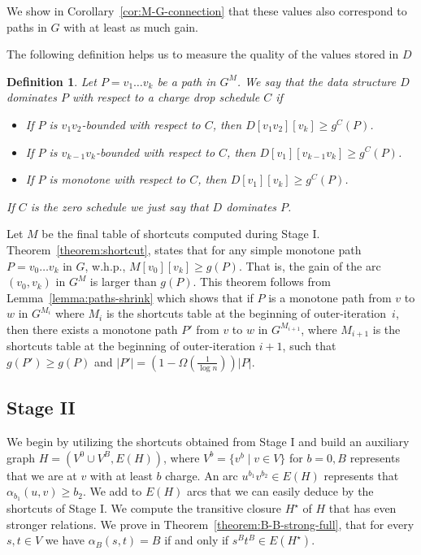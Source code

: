\documentclass[11pt]{article}
\newtheorem{definition}[theorem]{Definition}
\begin{document}
We show in Corollary~\ref{cor:M-G-connection} that these values also correspond to paths in $G$ with at least as much gain.

The following definition  helps us to measure the quality of the values stored in $D$

\begin{definition}
    Let $P=v_1 \ldots v_k$ be a path in $G^M$. We say that the data structure $D$ \emph{dominates} $P$ with respect to a charge drop schedule $C$ if 
    \begin{itemize}
        \item If $P$ is $v_1 v_2$-bounded with respect to $C$, then $D[v_1 v_2][v_k] \ge g^C(P)$.
        \item If $P$ is $v_{k-1} v_k$-bounded with respect to $C$, then $D[v_1][v_{k-1} v_k] \ge g^C(P)$.
        \item If $P$ is monotone with respect to $C$, then $D[v_1][v_k]\ge g^C(P)$.
    \end{itemize}
    If $C$ is the zero schedule we just say that $D$ dominates $P$.
\end{definition}



Let $M$ be the final table of shortcuts computed during Stage I.
Theorem~\ref{theorem:shortcut}, states that for any simple monotone path $P=v_0\ldots v_k$ in $G$, w.h.p.,  $M[v_0][v_k]\ge g(P)$. 
That is, the gain of the arc $(v_0,v_k)$ in
$G^M$ is larger than 
$g(P)$.
This theorem follows from 
Lemma~\ref{lemma:paths-shrink} which shows 
that if $P$ is a monotone path from $v$ to $w$ in $G^{M_i}$
where $M_i$ is the shortcuts table at the beginning of outer-iteration~$i$,
 then there exists a monotone path $P'$ from $v$ to $w$ in $G^{M_{i+1}}$,
where 
$M_{i+1}$ is the shortcuts table at the beginning of outer-iteration $i+1$,
such that  $g(P')\ge g(P)$
and 
 $|P'|=\left(1-\Omega\left( \frac{1}{\log n}\right) \right)|P|$. 


\subsection{Stage II}
We begin by utilizing the shortcuts obtained from Stage I and build an auxiliary graph $H = (V^0 \cup V^B, E(H))$, where $V^b = \{v^b \mid v\in V \}$ for $b=0,B$ represents that we are at $v$ with at least $b$ charge.  An arc $u^{b_1}v^{b_2}\in E(H)$ represents that $\alpha_{b_1}(u,v)\ge b_2$. We add to $E(H)$ arcs that we can easily deduce by the shortcuts of Stage I. We compute the transitive closure $H^\star$  of $H$ that has even stronger relations. 
We prove in Theorem~\ref{theorem:B-B-strong-full}, that for every $s,t\in V$ we have $\alpha_B(s,t)=B$ if and only if $s^B t^B \in E(H^\star)$.
\end{document}
